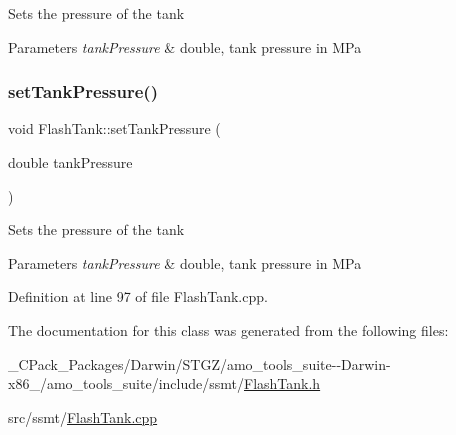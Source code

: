 Sets the pressure of the tank 
\begin{DoxyParams}{Parameters}
{\em tank\+Pressure} & double, tank pressure in M\+Pa \\
\hline
\end{DoxyParams}
\mbox{\label{class_flash_tank_a8b3bb51a62dac4f76284dfdc114d83fe}} 
\subsubsection{\texorpdfstring{set\+Tank\+Pressure()}{setTankPressure()}\hspace{0.1cm}{\footnotesize\ttfamily [3/3]}}
{\footnotesize\ttfamily void Flash\+Tank\+::set\+Tank\+Pressure (\begin{DoxyParamCaption}\item[{double}]{tank\+Pressure }\end{DoxyParamCaption})}

Sets the pressure of the tank 
\begin{DoxyParams}{Parameters}
{\em tank\+Pressure} & double, tank pressure in M\+Pa \\
\hline
\end{DoxyParams}


Definition at line 97 of file Flash\+Tank.\+cpp.



The documentation for this class was generated from the following files\+:\begin{DoxyCompactItemize}
\item 
\+\_\+\+C\+Pack\+\_\+\+Packages/\+Darwin/\+S\+T\+G\+Z/amo\+\_\+tools\+\_\+suite-\/-\/\+Darwin-\/x86\+\_/amo\+\_\+tools\+\_\+suite/include/ssmt/\hyperlink{___c_pack___packages_2_darwin_2_s_t_g_z_2amo__tools__suite--_darwin-x86__64_2amo__tools__suite_2include_2ssmt_2_flash_tank_8h}{Flash\+Tank.\+h}\item 
src/ssmt/\hyperlink{_flash_tank_8cpp}{Flash\+Tank.\+cpp}\end{DoxyCompactItemize}
